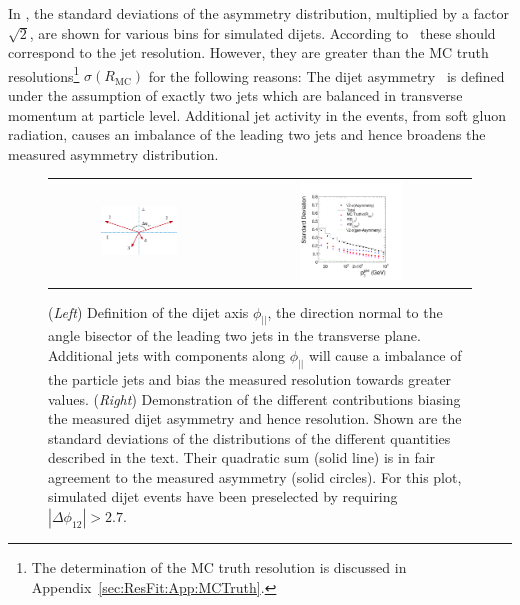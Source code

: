 In , the standard deviations of
the asymmetry distribution, multiplied by a factor $\sqrt{2}$,
are shown for various \ptgen bins for simulated dijets.
According to~ these should correspond to the
jet \pt resolution.
However, they are greater than the MC truth resolutions\footnote{The
  determination of the MC truth resolution is discussed in
  Appendix~\ref{sec:ResFit:App:MCTruth}.} $\sigma(R_{\text{MC}})$ for
the following reasons:
The dijet asymmetry~ is defined under the assumption of exactly two jets which are balanced in transverse momentum at particle level.
Additional jet activity in the events, \eg from soft gluon
radiation, causes an imbalance of the leading two jets and hence
broadens the measured asymmetry distribution.

\begin{figure}[ht]
 \centering
  \begin{tabular}{cc}
    \includegraphics[width=0.45\textwidth]{figures/Sketch_Projections} &
    \includegraphics[width=0.45\textwidth]{figures/Spring10QCDDiJet_ParallelComponent_hParallelContributions} \\
 \end{tabular}
  \caption{(\textit{Left}) Definition of the dijet axis $\phi_{||}$, the direction normal to the
    angle bisector of the leading two jets in the transverse plane.
    Additional jets with \pt components along $\phi_{||}$ will cause
    a \pt imbalance of the particle jets and bias the measured
    resolution towards greater values. 
    (\textit{Right}) Demonstration of the different
    contributions biasing the measured dijet asymmetry and hence resolution.
    Shown are the standard deviations of the distributions of the
    different quantities described in the text. 
    Their quadratic sum (solid line) is in fair agreement to the
    measured asymmetry (solid circles).
    For this plot, simulated dijet events have been preselected by requiring \mbox{$|\Delta\phi_{12}| > 2.7$}.
 }
  \label{fig:ResFit:DataDriven:AddJets:Bias}
\end{figure}

